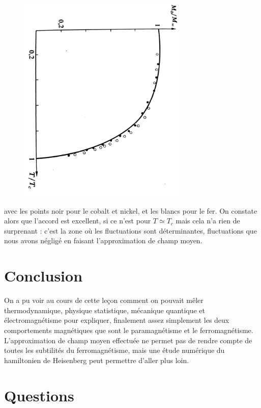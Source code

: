 \documentclass[12pt,prb,aps,epsf]{article}
\begin{document}
\begin{figure}[h]
	\centerline{\includegraphics[width=8cm,angle=90]{comparaison}}

\end{figure}

avec les points noir pour le cobalt et nickel, et les blancs pour le fer. On constate alors que l'accord est excellent, si ce n'est pour $T\simeq T_c$ mais cela n'a rien de surprenant : c'est la zone où les fluctuations sont déterminantes, fluctuations que nous avons négligé en faisant l'approximation de champ moyen.
	
\section{Conclusion}
On a pu voir au cours de cette leçon comment on pouvait mêler thermodynamique, physique statistique, mécanique quantique et électromagnétisme pour expliquer, finalement assez simplement les deux comportements magnétiques que sont le paramagnétisme et le ferromagnétisme. L'approximation de champ moyen effectuée ne permet pas de rendre compte de toutes les subtilités du ferromagnétisme, mais une étude numérique du hamiltonien de Heisenberg peut permettre d'aller plus loin.

\section*{Questions}
\end{document}
